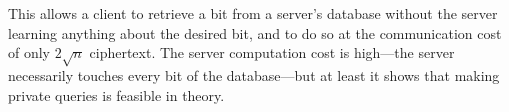 This allows a client to retrieve a bit from
a server's database without the server learning
anything about the desired bit, and to do so at 
the communication cost of only $2\sqrt{n}$ ciphertext. The server
computation cost is high---the server necessarily
touches every bit of the database---but at least it
shows that making private queries is feasible in theory.
